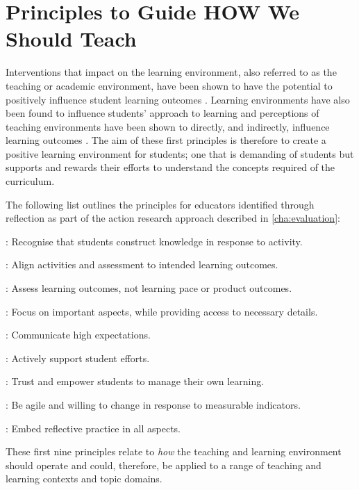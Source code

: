 \clearpage


\section{Principles to Guide HOW We Should Teach} %
\label{sub:how_principles}

Interventions that impact on the learning environment, also referred to as the teaching or academic environment, have been shown to have the potential to positively influence student learning outcomes \cite{Trigwell:1991}. Learning environments have also been found to influence students' approach to learning \cite{Entwistle:1990,Entwistle:1991,Kember:2007} and perceptions of teaching environments have been shown to directly, and indirectly, influence learning outcomes \cite{Meyer:1990,Lizzio:2002}. The aim of these first principles is therefore to create a positive learning environment for students; one that is demanding of students but supports and rewards their efforts to understand the concepts required of the curriculum. 

The following list outlines the principles for educators identified through reflection as part of the action research approach described in \cref{cha:evaluation}:
\begin{description}
	\item [\Pref{itm:construct}]: Recognise that students construct knowledge in response to activity.
	\item [\Pref{itm:align}]: Align activities and assessment to intended learning outcomes.
	\item [\Pref{itm:formative}]: Assess learning outcomes, not learning pace or product outcomes. 
	\item [\Pref{itm:focus}]: Focus on important aspects, while providing access to necessary details.
	\item [\Pref{itm:expectations}]: Communicate high expectations.
	\item [\Pref{itm:support}]: Actively support student efforts.
	\item [\Pref{itm:theory_y}]: Trust and empower students to manage their own learning.
	\item [\Pref{itm:agile}]: Be agile and willing to change in response to measurable indicators.
	\item [\Pref{itm:reflect}]: Embed reflective practice in all aspects.
\end{description}

These first nine principles relate to \emph{how} the teaching and learning environment should operate and could, therefore, be applied to a range of teaching and learning contexts and topic domains.

